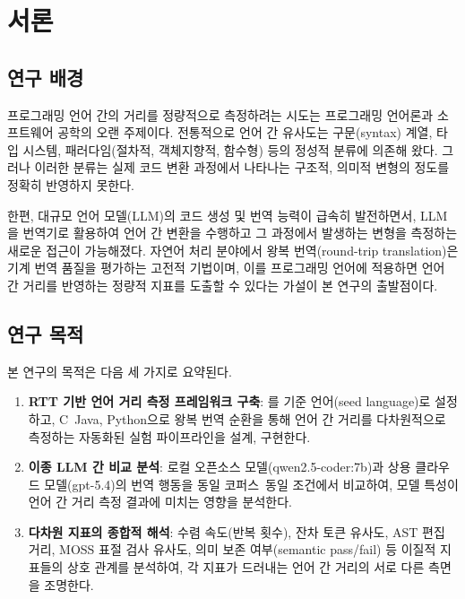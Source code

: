 \section{서론}\label{sec:introduction}

\subsection{연구 배경}\label{ssec:background}

프로그래밍 언어 간의 거리를 정량적으로 측정하려는 시도는 프로그래밍 언어론과 소프트웨어 공학의 오랜 주제이다. 
전통적으로 언어 간 유사도는 구문(syntax) 계열, 타입 시스템, 패러다임(절차적, 객체지향적, 함수형) 등의 정성적 분류에 의존해 왔다.
그러나 이러한 분류는 실제 코드 변환 과정에서 나타나는 구조적, 의미적 변형의 정도를 정확히 반영하지 못한다.

한편, 대규모 언어 모델(LLM)의 코드 생성 및 번역 능력이 급속히 발전하면서, LLM을 번역기로 활용하여 언어 간 변환을 수행하고 그 과정에서 발생하는 변형을 측정하는 새로운 접근이 가능해졌다.
자연어 처리 분야에서 왕복 번역(round-trip translation)은 기계 번역 품질을 평가하는 고전적 기법이며, 이를 프로그래밍 언어에 적용하면 언어 간 거리를 반영하는 정량적 지표를 도출할 수 있다는 가설이 본 연구의 출발점이다.

\subsection{연구 목적}\label{ssec:objectives}

본 연구의 목적은 다음 세 가지로 요약된다.

\begin{enumerate}[leftmargin=2em, label=\arabic*)]
  \item \textbf{RTT 기반 언어 거리 측정 프레임워크 구축}:
    \cpp{}를 기준 언어(seed language)로 설정하고, C\, Java, Python으로 
    왕복 번역 순환을 통해 언어 간 거리를 다차원적으로 측정하는 자동화된 실험
    파이프라인을 설계, 구현한다.
  \item \textbf{이종 LLM 간 비교 분석}:
    로컬 오픈소스 모델(qwen2.5-coder:7b)과 상용 클라우드 모델(gpt-5.4)의 번역 행동을 동일 코퍼스\, 동일 조건에서 비교하여, 모델 특성이 언어 간 거리 측정 결과에 미치는 영향을 분석한다.
  \item \textbf{다차원 지표의 종합적 해석}:
  	수렴 속도(반복 횟수), 잔차 토큰 유사도, AST 편집 거리, MOSS 표절 검사 유사도,
    의미 보존 여부(semantic pass/fail) 등 이질적 지표들의 상호 관계를 분석하여,
    각 지표가 드러내는 언어 간 거리의 서로 다른 측면을 조명한다.
\end{enumerate}